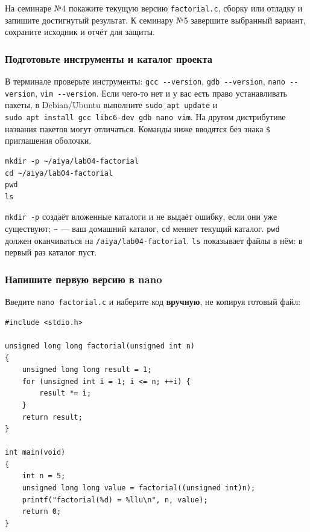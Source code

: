 На семинаре №4 покажите текущую версию \texttt{factorial.c}, сборку или
отладку и запишите достигнутый результат. К семинару №5 завершите
выбранный вариант, сохраните исходник и отчёт для защиты.

\hypertarget{ux43fux43eux434ux433ux43eux442ux43eux432ux44cux442ux435-ux438ux43dux441ux442ux440ux443ux43cux435ux43dux442ux44b-ux438-ux43aux430ux442ux430ux43bux43eux433-ux43fux440ux43eux435ux43aux442ux430}{%
\subsubsection{Подготовьте инструменты и каталог
проекта}\label{ux43fux43eux434ux433ux43eux442ux43eux432ux44cux442ux435-ux438ux43dux441ux442ux440ux443ux43cux435ux43dux442ux44b-ux438-ux43aux430ux442ux430ux43bux43eux433-ux43fux440ux43eux435ux43aux442ux430}}

В терминале проверьте инструменты: \texttt{gcc\ -\/-version},
\texttt{gdb\ -\/-version}, \texttt{nano\ -\/-version},
\texttt{vim\ -\/-version}. Если чего-то нет и у вас есть право
устанавливать пакеты, в Debian/Ubuntu выполните
\texttt{sudo\ apt\ update} и
\texttt{sudo\ apt\ install\ gcc\ libc6-dev\ gdb\ nano\ vim}. На другом
дистрибутиве названия пакетов могут отличаться. Команды ниже вводятся
без знака \texttt{\$} приглашения оболочки.

\begin{verbatim}
mkdir -p ~/aiya/lab04-factorial
cd ~/aiya/lab04-factorial
pwd
ls
\end{verbatim}

\texttt{mkdir\ -p} создаёт вложенные каталоги и не выдаёт ошибку, если
они уже существуют; \texttt{\textasciitilde{}} --- ваш домашний каталог,
\texttt{cd} меняет текущий каталог. \texttt{pwd} должен оканчиваться на
\texttt{/aiya/lab04-factorial}. \texttt{ls} показывает файлы в нём: в
первый раз каталог пуст.

\hypertarget{ux43dux430ux43fux438ux448ux438ux442ux435-ux43fux435ux440ux432ux443ux44e-ux432ux435ux440ux441ux438ux44e-ux432-nano}{%
\subsubsection{Напишите первую версию в
nano}\label{ux43dux430ux43fux438ux448ux438ux442ux435-ux43fux435ux440ux432ux443ux44e-ux432ux435ux440ux441ux438ux44e-ux432-nano}}

Введите \texttt{nano\ factorial.c} и наберите код \textbf{вручную}, не
копируя готовый файл:

\begin{verbatim}
#include <stdio.h>

unsigned long long factorial(unsigned int n)
{
    unsigned long long result = 1;
    for (unsigned int i = 1; i <= n; ++i) {
        result *= i;
    }
    return result;
}

int main(void)
{
    int n = 5;
    unsigned long long value = factorial((unsigned int)n);
    printf("factorial(%d) = %llu\n", n, value);
    return 0;
}
\end{verbatim}


